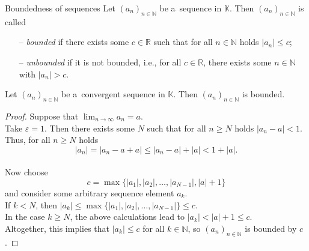 \begin{Definition}{Boundedness of sequences}
  Let $(a_n)_{n\in\mathbb{N}}$ be a~sequence in $\mathbb{K}$. Then $(a_n)_{n\in\mathbb{N}}$ is called
\begin{itemize}
  \item[--] \emph{bounded} if there exists some $c\in\mathbb{R}$ such that for all $n\in\mathbb{N}$ holds $|a_n|\leq c$;
  \item[--] \emph{unbounded} if it is not bounded, i.e., for all $c\in\mathbb{R}$, there exists some $n\in\mathbb{N}$ with $|a_n|> c$.
\end{itemize}
\end{Definition}

\begin{Theorem}
  Let $(a_n)_{n\in\mathbb{N}}$ be a~convergent sequence in $\mathbb{K}$. Then $(a_n)_{n\in\mathbb{N}}$ is bounded.
\end{Theorem}

\begin{proof}
Suppose that $\lim_{n\to\infty}a_n=a$.\\
Take $\varepsilon=1$. Then there exists some $N$ such that for all $n\geq N$ holds $|a_n-a|<1$.\\
Thus, for all $n\geq N$ holds
\[|a_n|=|a_n-a+a|\leq |a_n-a|+|a|<1+|a|.\]\\
Now choose
\[c=\max\{|a_1|,|a_2|,\ldots,|a_{N-1}|,|a|+1\}\]
and consider some arbitrary sequence element $a_k$.\\
If $k<N$, then $|a_k|\leq \max\{|a_1|,|a_2|,\ldots,|a_{N-1}|\}\leq c$.\\
In the case $k\geq N$, the above calculations lead to $|a_k|<|a|+1\leq c$.\\
Altogether, this implies that $|a_k|\leq c$ for all $k\in\mathbb{N}$, so $(a_n)_{n\in\mathbb{N}}$ is bounded by $c$.
\end{proof}

